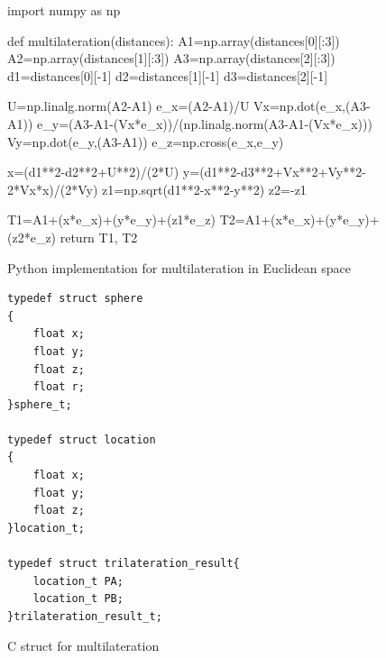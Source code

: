 \documentclass[\main/thesis.tex]{subfiles}
\begin{document}
\begin{figure}[H]
    \begin{python}
import numpy as np

def multilateration(distances):
    A1=np.array(distances[0][:3])
    A2=np.array(distances[1][:3])
    A3=np.array(distances[2][:3])
    d1=distances[0][-1]
    d2=distances[1][-1]
    d3=distances[2][-1]

    U=np.linalg.norm(A2-A1)
    e_x=(A2-A1)/U
    Vx=np.dot(e_x,(A3-A1))
    e_y=(A3-A1-(Vx*e_x))/(np.linalg.norm(A3-A1-(Vx*e_x)))
    Vy=np.dot(e_y,(A3-A1))
    e_z=np.cross(e_x,e_y)

    x=(d1**2-d2**2+U**2)/(2*U)
    y=(d1**2-d3**2+Vx**2+Vy**2-2*Vx*x)/(2*Vy)
    z1=np.sqrt(d1**2-x**2-y**2)
    z2=-z1

    T1=A1+(x*e_x)+(y*e_y)+(z1*e_z)
    T2=A1+(x*e_x)+(y*e_y)+(z2*e_z)
    return T1, T2
    \end{python}
    \caption{Python implementation for multilateration in Euclidean space}
    \label{fig:multilateration_python_implementation}
\end{figure}

\begin{figure}[H]
    \begin{lstlisting}[style=CStyle]
typedef struct sphere
{
    float x;
    float y;
    float z;
    float r;
}sphere_t;

typedef struct location
{
    float x;
    float y;
    float z;
}location_t;

typedef struct trilateration_result{
    location_t PA;
    location_t PB;
}trilateration_result_t;
\end{lstlisting}
\caption{C struct for multilateration}
\label{fig:c_struct_for_multilateration}
\end{figure}
\end{document}
